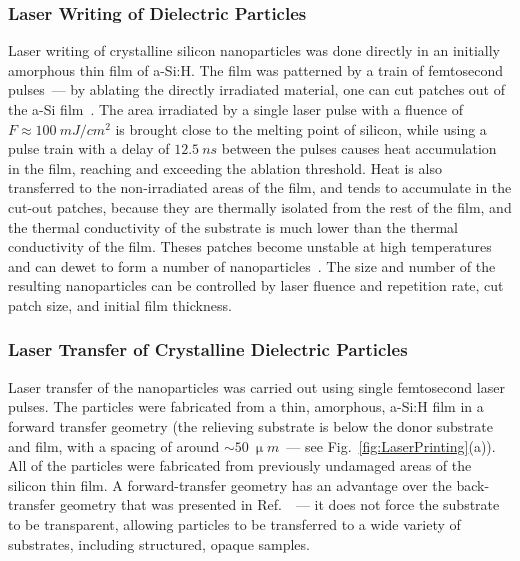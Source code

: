         \subsubsection{Laser Writing of Dielectric Particles}
        \label{met:writing}
                Laser writing of crystalline silicon nanoparticles was done directly in an initially amorphous thin film of a-Si:H.
            The film was patterned by a train of femtosecond pulses~--- by ablating the directly irradiated material, one can cut patches
            out of the a-Si film~\cite{makarov2016controllable,dmitriev2016direct}. The area irradiated by a single laser pulse
            with a fluence of $F\approx100~\si{mJ/cm^{2}}$ is brought close to the melting point of silicon, while using a pulse train with
            a delay of $12.5~\si{ns}$ between the pulses causes heat accumulation in the film, reaching and exceeding the ablation threshold.
                Heat is also transferred to the non-irradiated areas of the film, and tends to accumulate in the cut-out patches, because they
            are thermally isolated from the rest of the film, and the thermal conductivity of the substrate is much lower than the thermal
            conductivity of the film. Theses patches become unstable at high temperatures and can dewet to form a number of nanoparticles~\cite{thompson2012solid}.
            The size and number of the resulting nanoparticles can be controlled by laser fluence and repetition rate, cut patch size, and
            initial film thickness.

        \subsubsection{Laser Transfer of Crystalline Dielectric Particles}
        \label{met:transfer}

                Laser transfer of the nanoparticles was carried out using single femtosecond laser pulses. The particles were fabricated from
            a thin, amorphous, a-Si:H film in a forward transfer geometry (the relieving substrate is below the donor substrate and film, with a
            spacing of around $\sim 50~\si{\upmu m}$~--- see Fig.~\ref{fig:LaserPrinting}(a)). All of the particles were fabricated from
            previously undamaged areas of the silicon thin film. A forward-transfer geometry has an advantage over the back-transfer geometry
            that was presented in Ref.~\cite{zywietz2014laser}~--- it does not force the substrate to be transparent, allowing particles to be
            transferred to a wide variety of substrates, including structured, opaque samples.

